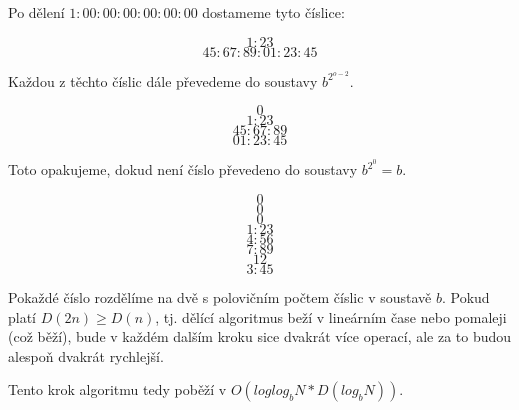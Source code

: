 \documentclass{article}
\begin{document}
Po dělení \(1:00:00:00:00:00:00\) dostameme tyto číslice:

\begin{equation*}
    1:23
\end{equation*}
\begin{equation*}
    45:67:89:01:23:45
\end{equation*}

Každou z těchto číslic dále převedeme do soustavy \(b^{2^{o - 2}}\).

\begin{equation*}
    0
\end{equation*}
\begin{equation*}
    1:23
\end{equation*}
\begin{equation*}
    45:67:89
\end{equation*}
\begin{equation*}
    01:23:45
\end{equation*}

Toto opakujeme, dokud není číslo převedeno do soustavy \(b^{2^{0}} = b\).

\begin{equation*}
    0
\end{equation*}
\begin{equation*}
    0
\end{equation*}
\begin{equation*}
    0
\end{equation*}
\begin{equation*}
    1:23
\end{equation*}
\begin{equation*}
    4:56
\end{equation*}
\begin{equation*}
    7:89
\end{equation*}
\begin{equation*}
    12
\end{equation*}
\begin{equation*}
    3:45
\end{equation*}

Pokaždé číslo rozdělíme na dvě s polovičním počtem číslic v soustavě \(b\). Pokud platí \(D(2n) \ge D(n)\), tj. dělící algoritmus beží v lineárním čase nebo pomaleji (což běží), bude v každém dalším kroku sice dvakrát více operací, ale za to budou alespoň dvakrát rychlejší.

Tento krok algoritmu tedy poběží v \(O(log log_b N * D(log_b N))\).
\end{document}
